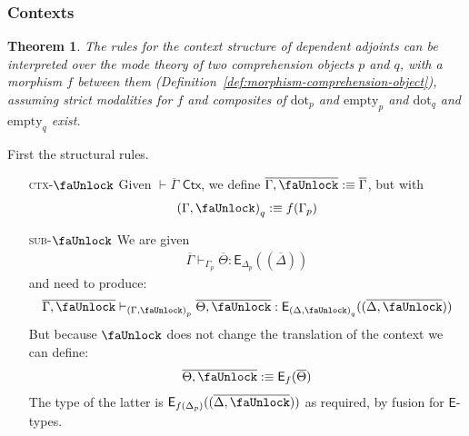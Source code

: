 \documentclass[10pt]{article}
\newtheorem{theorem}{Theorem}
\theoremstyle{definition}
\newcommand{\yields}{\vdash}
\newcommand{\CTX}{\,\,\mathsf{Ctx}}
\newcommand\Esym{\ensuremath{\mathsf{E}}}
\newcommand\E[2]{\ensuremath{\mathsf{E}_{#1}(#2)}}
\newcommand\EIs[2]{\ensuremath{\mathsf{E}_{#1}{(#2)}}}
\newcommand\ctxtuple[1]{(#1)}
\newcommand{\modeof}[1]{{#1}_p}
\newcommand{\modeofq}[1]{{#1}_q}
\newcommand{\sdot}{\ensuremath{\mathrm{dot}}}
\newcommand{\sempty}{\ensuremath{\mathrm{empty}}}
\newcommand{\upstairs}[1]{\overline{#1}}
\newcommand{\lock}{\text{\faUnlock}}
\begin{document}
\subsubsection{Contexts}

\begin{theorem}
  The rules for the context structure of dependent adjoints can be
  interpreted over the mode theory of two comprehension objects $p$ and
  $q$, with a morphism $f$ between them
  (Definition~\ref{def:morphism-comprehension-object}), assuming strict
  modalities for $f$ and composites of $\sdot_p$ and $\sempty_p$ and
  $\sdot_q$ and $\sempty_q$ exist.
\end{theorem}

First the structural rules.
\begin{enumerate}
\item[\textsc{ctx-$\lock$}] Given $\yields \upstairs{\Gamma} \CTX$, we define $\upstairs{\Gamma, \lock} :\equiv \upstairs{\Gamma}$, but with
\begin{align*}
\modeofq{(\Gamma, \lock)} :\equiv f(\modeof{\Gamma})
\end{align*}
%
\item[\textsc{sub-$\lock$}] We are given
\begin{align*}
\upstairs{\Gamma} \yields_{\modeof{\Gamma}} \upstairs{\Theta} : \E{\modeof{\Delta}}{\ctxtuple{\upstairs{\Delta}}}
\end{align*}
and need to produce:
\begin{align*}
\upstairs{\Gamma, \lock} \yields_{\modeof{(\Gamma, \lock)}} \upstairs{\Theta, \lock} : \E{\modeofq{(\Delta, \lock)}}{\ctxtuple{\upstairs{\Delta, \lock}}}
\end{align*}
But because $\lock$ does not change the translation of the context we can define:
\begin{align*}
\upstairs{\Theta, \lock} :\equiv \EIs{f}{\upstairs{\Theta}}
\end{align*}
The type of the latter is $\E{f(\modeof{\Delta})}{\ctxtuple{\upstairs{\Delta, \lock}}}$ as required, by fusion for $\Esym$-types.
\end{enumerate}
\end{document}
